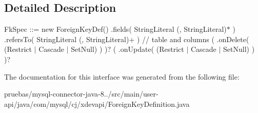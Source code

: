 \subsection{Detailed Description}
Fk\+Spec \+:\+:= \textquotesingle{}new Foreign\+Key\+Def()\textquotesingle{} \textquotesingle{}.fields(\textquotesingle{} String\+Literal (\textquotesingle{},\textquotesingle{} String\+Literal)$\ast$ \textquotesingle{})\textquotesingle{} \textquotesingle{}.refers\+To(\textquotesingle{} String\+Literal (\textquotesingle{},\textquotesingle{} String\+Literal)+ \textquotesingle{})\textquotesingle{} // table and columns ( \textquotesingle{}.on\+Delete(\textquotesingle{} (\textquotesingle{}Restrict\textquotesingle{} $\vert$ \textquotesingle{}Cascade\textquotesingle{} $\vert$ \textquotesingle{}Set\+Null\textquotesingle{}) \textquotesingle{})\textquotesingle{} )? ( \textquotesingle{}.on\+Update(\textquotesingle{} (\textquotesingle{}Restrict\textquotesingle{} $\vert$ \textquotesingle{}Cascade\textquotesingle{} $\vert$ \textquotesingle{}Set\+Null\textquotesingle{}) \textquotesingle{})\textquotesingle{} )? 

The documentation for this interface was generated from the following file\+:\begin{DoxyCompactItemize}
\item 
pruebas/mysql-\/connector-\/java-\/8../src/main/user-\/api/java/com/mysql/cj/xdevapi/Foreign\+Key\+Definition.\+java\end{DoxyCompactItemize}
